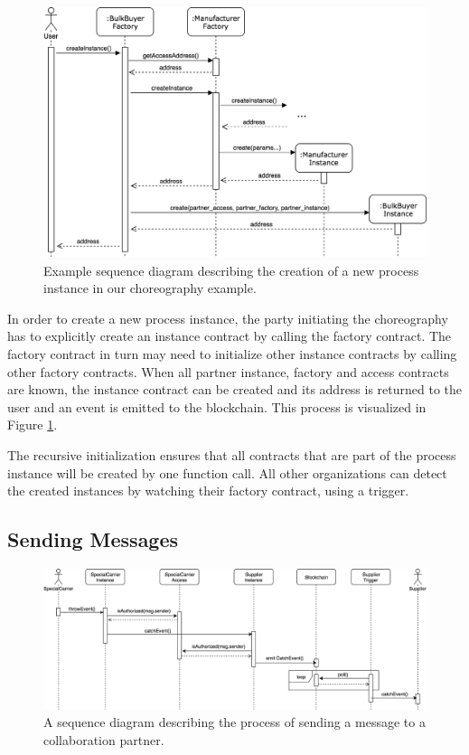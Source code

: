 \documentclass[runningheads]{llncs}
\begin{document}
\begin{figure}
	\centering
	\includegraphics[width=\textwidth]{fig/instance_creation.eps}
	\caption{Example sequence diagram describing the creation of a new process instance in our choreography example.}
	\label{fig:instance_creation}
\end{figure}

In order to create a new process instance, the party initiating the choreography has to explicitly create an instance contract by calling the factory contract.
The factory contract in turn may need to initialize other instance contracts by calling other factory contracts.
When all partner instance, factory and access contracts are known, the instance contract can be created and its address is returned to the user and an event is emitted to the blockchain.
This process is visualized in Figure \ref{fig:instance_creation}.

The recursive initialization ensures that all contracts that are part of the process instance will be created by one function call.
All other organizations can detect the created instances by watching their factory contract, using a trigger.

\subsection{Sending Messages}
\begin{figure}
	\centering
	\includegraphics[width=\textwidth]{fig/event_sending.eps}
	\caption{A sequence diagram describing the process of sending a message to a collaboration partner.}
	\label{fig:event_sending}
\end{figure}
\end{document}
